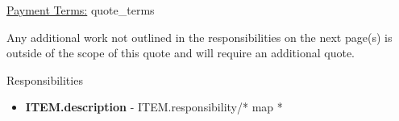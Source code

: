 \documentclass{letter}
\begin{document}
\vspace{3 cm}

\underline{Payment Terms:} {{ quote_terms }}

\vspace{0.5 cm}

\small{Any additional work not outlined in the responsibilities on the next page(s) is outside of the scope of this quote and will require an additional quote.}

\newpage

\Large{Responsibilities}

\begin{itemize}{* map ITEM *}
  \item \textbf{{{ITEM.description}}} - {{ITEM.responsibility}}{/* map *}
\end{itemize}
\end{document}
